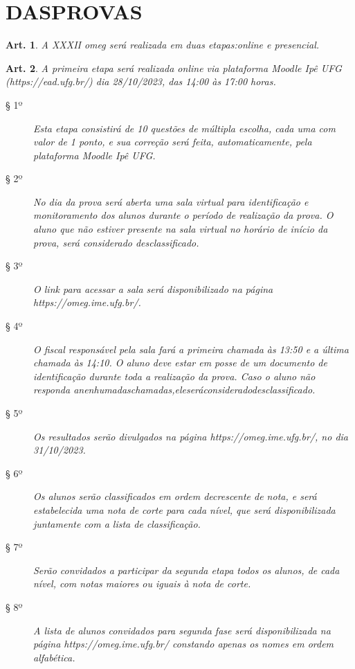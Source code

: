 \documentclass[a4paper,12pt]{article}
\newtheorem{article}{Art.}
\begin{document}
\section{DASPROVAS}

\begin{article}
  A XXXII \acrshort{omeg} será realizada em duas etapas:online e presencial.
\end{article}

\begin{article}
  A primeira etapa será realizada online via plataforma Moodle Ipê UFG
  (https://ead.ufg.br/) dia 28/10/2023, das 14:00 às 17:00 horas.
  \begin{description}
    \item[§ 1º]
      Esta etapa consistirá de 10 questões de múltipla escolha, cada uma com
      valor de 1 ponto, e sua correção será feita, automaticamente, pela plataforma
      Moodle Ipê UFG.
    \item[§ 2º]
      No dia da prova será aberta uma sala virtual para identificação e
      monitoramento dos alunos durante o período de realização da prova. O
      aluno que não estiver presente na sala virtual no horário de início da
      prova, será considerado desclassificado.
    \item[§ 3º]
      O link para acessar a sala será disponibilizado na página
      https://omeg.ime.ufg.br/.
    \item[§ 4º]
      O fiscal responsável pela sala fará a primeira chamada às 13:50 e a
      última chamada às 14:10. O aluno deve estar em posse de um documento de
      identificação durante toda a realização da prova. Caso o aluno não responda
      anenhumadaschamadas,eleseráconsideradodesclassificado.
    \item[§ 5º]
      Os resultados serão divulgados na página https://omeg.ime.ufg.br/, no dia
      31/10/2023.
    \item[§ 6º]
      Os alunos serão classificados em ordem decrescente de nota, e será
      estabelecida uma nota de corte para cada nível, que será disponibilizada
      juntamente com a lista de classificação.
    \item[§ 7º]
      Serão convidados a participar da segunda etapa todos os alunos, de cada
      nível, com notas maiores ou iguais à nota de corte.
    \item[§ 8º]
      A lista de alunos convidados para segunda fase será disponibilizada na
      página https://omeg.ime.ufg.br/ constando apenas os nomes em ordem
      alfabética.
  \end{description}
\end{article}
\end{document}
